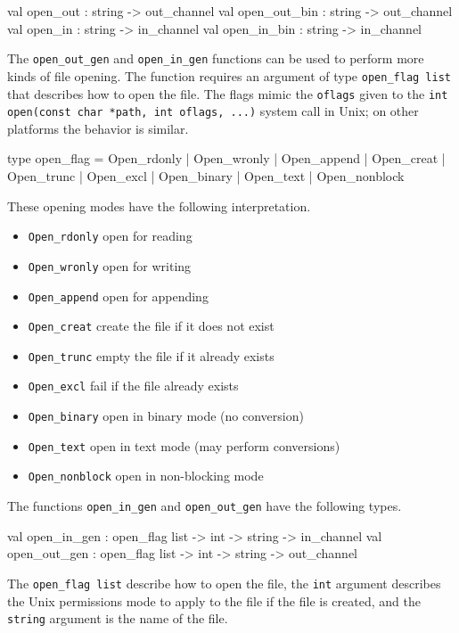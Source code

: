 \begin{ocaml}
val open_out : string -> out_channel
val open_out_bin : string -> out_channel
val open_in : string -> in_channel
val open_in_bin : string -> in_channel
\end{ocaml}
%
  The
\hbox{\lstinline/open_out_gen/} and \hbox{\lstinline/open_in_gen/} functions can be used to perform
more kinds of file opening. The function requires an argument of type
\hbox{\lstinline/open_flag list/}
%
that describes how to open the file.  The flags mimic the \hbox{\lstinline/oflags/}  given to
the \hbox{\lstinline/int open(const char *path, int oflags, ...)/} system call in Unix; on other
platforms the behavior is similar.

\begin{ocaml}
type open_flag =
    Open_rdonly | Open_wronly | Open_append
  | Open_creat  | Open_trunc  | Open_excl
  | Open_binary | Open_text   | Open_nonblock
\end{ocaml}
%
These opening modes have the following interpretation.

\begin{itemize}
\item \lstinline/Open_rdonly/ open for reading
\item \lstinline/Open_wronly/ open for writing
\item \lstinline/Open_append/ open for appending
\item \lstinline/Open_creat/ create the file if it does not exist
\item \lstinline/Open_trunc/ empty the file if it already exists
\item \lstinline/Open_excl/ fail if the file already exists
\item \lstinline/Open_binary/ open in binary mode (no conversion)
\item \lstinline/Open_text/ open in text mode (may perform conversions)
\item \lstinline/Open_nonblock/ open in non-blocking mode
\end{itemize}
%
The functions \hbox{\lstinline$open_in_gen$} and \hbox{\lstinline$open_out_gen$} have
the following types.
%
\begin{ocaml}
val open_in_gen  : open_flag list -> int -> string -> in_channel
val open_out_gen : open_flag list -> int -> string -> out_channel
\end{ocaml}
%
The \hbox{\lstinline/open_flag list/} describe how to open the file, the \hbox{\lstinline$int$}
argument describes the Unix permissions mode to apply to the file if the file is created, and
the \hbox{\lstinline/string/} argument is the name of the file.

